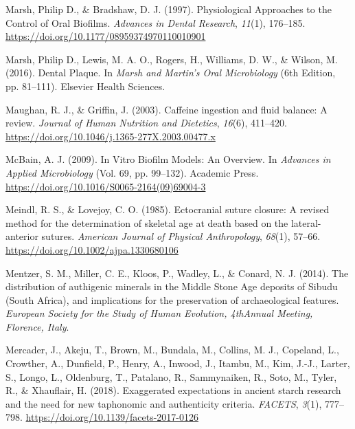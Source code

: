 \documentclass[
  letterpaper,
]{book}
\newlength{\cslhangindent}
\newlength{\cslentryspacingunit} %
\newenvironment{CSLReferences}[2] %
 {%
  \setlength{\parindent}{0pt}
  \ifodd #1
  \let\oldpar\par
  \def\par{\hangindent=\cslhangindent\oldpar}
  \fi
  \setlength{\parskip}{#2\cslentryspacingunit}
 }%
 {}
\begin{document}
\begin{CSLReferences}{1}{0}
\leavevmode{}%
Marsh, Philip D., \& Bradshaw, D. J. (1997). Physiological {Approaches}
to the {Control} of {Oral Biofilms}. \emph{Advances in Dental Research},
\emph{11}(1), 176--185.
\url{https://doi.org/10.1177/08959374970110010901}

\leavevmode{}%
Marsh, Philip D., Lewis, M. A. O., Rogers, H., Williams, D. W., \&
Wilson, M. (2016). Dental {Plaque}. In \emph{Marsh and {Martin}'s {Oral
Microbiology}} (6th Edition, pp. 81--111). {Elsevier Health Sciences}.

\leavevmode{}%
Maughan, R. J., \& Griffin, J. (2003). Caffeine ingestion and fluid
balance: A review. \emph{Journal of Human Nutrition and Dietetics},
\emph{16}(6), 411--420.
\url{https://doi.org/10.1046/j.1365-277X.2003.00477.x}

\leavevmode{}%
McBain, A. J. (2009). In {Vitro Biofilm Models}: {An Overview}. In
\emph{Advances in {Applied Microbiology}} (Vol. 69, pp. 99--132).
{Academic Press}. \url{https://doi.org/10.1016/S0065-2164(09)69004-3}

\leavevmode{}%
Meindl, R. S., \& Lovejoy, C. O. (1985). Ectocranial suture closure: {A}
revised method for the determination of skeletal age at death based on
the lateral-anterior sutures. \emph{American Journal of Physical
Anthropology}, \emph{68}(1), 57--66.
\url{https://doi.org/10.1002/ajpa.1330680106}

\leavevmode{}%
Mentzer, S. M., Miller, C. E., Kloos, P., Wadley, L., \& Conard, N. J.
(2014). The distribution of authigenic minerals in the {Middle Stone
Age} deposits of {Sibudu} ({South Africa}), and implications for the
preservation of archaeological features. \emph{European Society for the
Study of Human Evolution, {4thAnnual} Meeting, Florence, Italy}.

\leavevmode{}%
Mercader, J., Akeju, T., Brown, M., Bundala, M., Collins, M. J.,
Copeland, L., Crowther, A., Dunfield, P., Henry, A., Inwood, J., Itambu,
M., Kim, J.-J., Larter, S., Longo, L., Oldenburg, T., Patalano, R.,
Sammynaiken, R., Soto, M., Tyler, R., \& Xhauflair, H. (2018).
Exaggerated expectations in ancient starch research and the need for new
taphonomic and authenticity criteria. \emph{FACETS}, \emph{3}(1),
777--798. \url{https://doi.org/10.1139/facets-2017-0126}


\end{CSLReferences}
\end{document}
